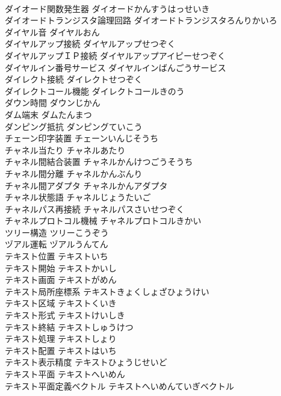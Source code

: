 \documentclass[8pt]{extreport}
\begin{document}
\begin{CJK}{UTF8}{min}
\\	ダイオード関数発生器	ダイオードかんすうはっせいき	
\\	ダイオードトランジスタ論理回路	ダイオードトランジスタろんりかいろ	
\\	ダイヤル音	ダイヤルおん	
\\	ダイヤルアップ接続	ダイヤルアップせつぞく	
\\	ダイヤルアップＩＰ接続	ダイヤルアップアイピーせつぞく	
\\	ダイヤルイン番号サービス	ダイヤルインばんごうサービス	
\\	ダイレクト接続	ダイレクトせつぞく	
\\	ダイレクトコール機能	ダイレクトコールきのう	
\\	ダウン時間	ダウンじかん	
\\	ダム端末	ダムたんまつ	
\\	ダンピング抵抗	ダンピングていこう	
\\	チェーン印字装置	チェーンいんじそうち	
\\	チャネル当たり	チャネルあたり	
\\	チャネル間結合装置	チャネルかんけつごうそうち	
\\	チャネル間分離	チャネルかんぶんり	
\\	チャネル間アダプタ	チャネルかんアダプタ	
\\	チャネル状態語	チャネルじょうたいご	
\\	チャネルパス再接続	チャネルパスさいせつぞく	
\\	チャネルプロトコル機械	チャネルプロトコルきかい	
\\	ツリー構造	ツリーこうぞう	
\\	ヅアル運転	ヅアルうんてん	
\\	テキスト位置	テキストいち	
\\	テキスト開始	テキストかいし	
\\	テキスト画面	テキストがめん	
\\	テキスト局所座標系	テキストきょくしょざひょうけい	
\\	テキスト区域	テキストくいき	
\\	テキスト形式	テキストけいしき	
\\	テキスト終結	テキストしゅうけつ	
\\	テキスト処理	テキストしょり	
\\	テキスト配置	テキストはいち	
\\	テキスト表示精度	テキストひょうじせいど	
\\	テキスト平面	テキストへいめん	
\\	テキスト平面定義ベクトル	テキストへいめんていぎベクトル	

\end{CJK}
\end{document}
